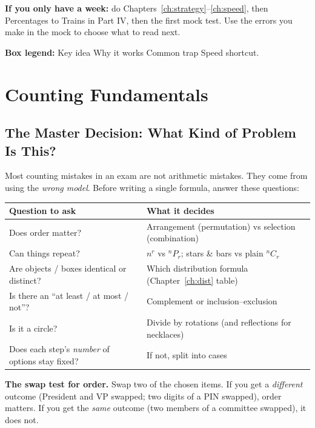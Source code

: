 \documentclass[11pt,a4paper,openany]{report}
\begin{document}
\begin{idea}
\textbf{If you only have a week:} do Chapters~\ref{ch:strategy}--\ref{ch:speed}, then Percentages to Trains in Part IV, then the first mock test. Use the errors you make in the mock to choose what to read next.

\textbf{Box legend:} \colorbox{blue!8}{Key idea} \colorbox{yellow!15}{Why it works}
\colorbox{red!8}{Common trap} \colorbox{green!10}{Speed shortcut}.
\end{idea}

\tableofcontents
\part{Counting Fundamentals}
\chapter{The Master Decision: What Kind of Problem Is This?}\label{ch:master}

Most counting mistakes in an exam are not arithmetic mistakes. They come from using the
\emph{wrong model}. Before writing a single formula, answer these questions:

\begin{center}
\begin{tabular}{>{\raggedright}p{5.2cm} >{\raggedright\arraybackslash}p{9.5cm}}
\toprule
\textbf{Question to ask} & \textbf{What it decides}\\
\midrule
Does order matter? & Arrangement (permutation) vs selection (combination)\\
Can things repeat? & $n^r$ vs $^nP_r$; stars \& bars vs plain $^nC_r$\\
Are objects / boxes identical or distinct? & Which distribution formula (Chapter~\ref{ch:dist} table)\\
Is there an ``at least / at most / not''? & Complement or inclusion--exclusion\\
Is it a circle? & Divide by rotations (and reflections for necklaces)\\
Does each step's \emph{number} of options stay fixed? & If not, split into cases\\
\bottomrule
\end{tabular}
\end{center}

\textbf{The swap test for order.} Swap two of the chosen items. If you get a \emph{different}
outcome (President and VP swapped; two digits of a PIN swapped), order matters. If you get the
\emph{same} outcome (two members of a committee swapped), it does not.
\end{document}
